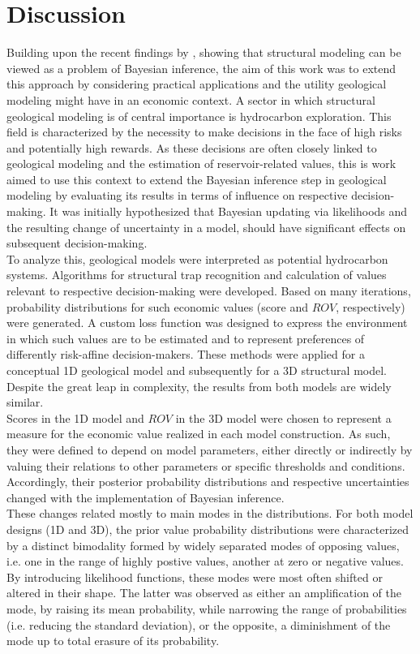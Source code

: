 	\chapter{Discussion}\label{cha:discussion}
	Building upon the recent findings by \citet{delaVarga2016}, showing that structural modeling can be viewed as a problem of Bayesian inference, the aim of this work was to extend this approach by considering practical applications and the utility geological modeling might have in an economic context. A sector in which structural geological modeling is of central importance is hydrocarbon exploration. This field is characterized by the necessity to make decisions in the face of high risks and potentially high rewards. As these decisions are often closely linked to geological modeling and the estimation of reservoir-related values, this is work aimed to use this context to extend the Bayesian inference step in geological modeling by evaluating its results in terms of influence on respective decision-making. It was initially hypothesized that Bayesian updating via likelihoods and the resulting change of uncertainty in a model, should have significant effects on subsequent decision-making.\\
	To analyze this, geological models were interpreted as potential hydrocarbon systems. Algorithms for structural trap recognition and calculation of values relevant to respective decision-making were developed. Based on many iterations, probability distributions for such economic values (score and $ROV$, respectively) were generated. A custom loss function was designed to express the environment in which such values are to be estimated and to represent preferences of differently risk-affine decision-makers. These methods were applied for a conceptual 1D geological model and subsequently for a 3D structural model. Despite the great leap in complexity, the results from both models are widely similar.\\
	Scores in the 1D model and $ROV$ in the 3D model were chosen to represent a measure for the economic value realized in each model construction. As such, they were defined to depend on model parameters, either directly or indirectly by valuing their relations to other parameters or specific thresholds and conditions. Accordingly, their posterior probability distributions and respective uncertainties changed with the implementation of Bayesian inference.\\ 
	These changes related mostly to main modes in the distributions. For both model designs (1D and 3D), the prior value probability distributions were characterized by a distinct bimodality formed by widely separated modes of opposing values, i.e. one in the range of highly postive values, another at zero or negative values. By introducing likelihood functions, these modes were most often shifted or altered in their shape. The latter was observed as either an amplification of the mode, by raising its mean probability, while narrowing the range of probabilities (i.e. reducing the standard deviation), or the opposite, a diminishment of the mode up to total erasure of its probability. 

